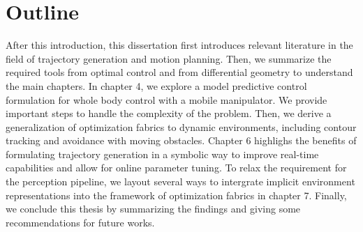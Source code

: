 \section{Outline}

After this introduction, this dissertation first introduces
relevant literature in the field of trajectory generation
and motion planning. Then, we summarize the required tools
from optimal control and from differential geometry to
understand the main chapters. In chapter 4, we explore a
model predictive control formulation for whole body control
with a mobile manipulator. We provide important steps to
handle the complexity of the problem. Then, we derive a
generalization of optimization fabrics to dynamic
environments, including contour tracking and avoidance with
moving obstacles. Chapter 6 highlighs the benefits of
formulating trajectory generation in a symbolic way to
improve real-time capabilities and allow for online
parameter tuning. To relax the requirement for the
perception pipeline, we layout several ways to intergrate
implicit environment representations into the framework of
optimization fabrics in chapter 7. Finally, we conclude this
thesis by summarizing the findings and giving some
recommendations for future works.
